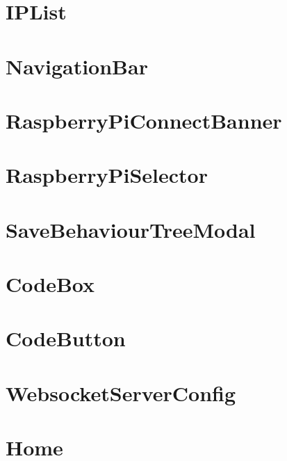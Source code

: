\documentclass[twoside]{book}
\newcommand{\+}{\discretionary{\mbox{\scriptsize$\hookleftarrow$}}{}{}}
\begin{document}
\chapter{IPList}
\label{md_src_lib_IPList}

\chapter{Navigation\+Bar}
\label{md_src_lib_NavigationBar}

\chapter{Raspberry\+Pi\+Connect\+Banner}
\label{md_src_lib_RaspberryPiConnectBanner}

\chapter{Raspberry\+Pi\+Selector}
\label{md_src_lib_RaspberryPiSelector}

\chapter{Save\+Behaviour\+Tree\+Modal}
\label{md_src_lib_SaveBehaviourTreeModal}

\chapter{Code\+Box}
\label{md_src_lib_validate_CodeBox}

\chapter{Code\+Button}
\label{md_src_lib_validate_CodeButton}

\chapter{Websocket\+Server\+Config}
\label{md_src_lib_WebsocketServerConfig}

\chapter{Home}
\label{md_src_routes_Home}

\end{document}
